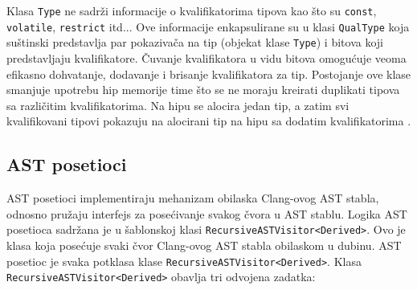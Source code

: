 \documentclass[12pt,oneside]{memoir}
\begin{document}
  \par
  Klasa \texttt{Type} ne sadr\v{z}i informacije o kvalifikatorima tipova kao \v{s}to su \texttt{const}, \texttt{volatile}, \texttt{restrict} itd... Ove informacije enkapsulirane su u klasi \texttt{QualType} koja su\v{s}tinski predstavlja par pokaziva\v{c}a na tip (objekat klase \texttt{Type}) i bitova koji predstavljaju
  kvalifikatore. \v{C}uvanje kvalifikatora u vidu bitova omogu\'{c}uje veoma efikasno dohvatanje, dodavanje i brisanje kvalifikatora za tip. Postojanje ove klase smanjuje upotrebu hip memorije time \v{s}to se ne moraju kreirati duplikati tipova sa razli\v{c}itim kvalifikatorima. Na hipu se alocira jedan tip, a zatim 
  svi kvalifikovani tipovi pokazuju na alocirani tip na hipu sa dodatim kvalifikatorima \cite{CFEWebsite}.

\subsection{AST posetioci}
AST posetioci implementiraju mehanizam obilaska Clang-ovog AST stabla, odnosno pru\v{z}aju interfejs
za pose\'{c}ivanje svakog \v{c}vora u AST stablu.
Logika AST posetioca sadr\v{z}ana je u šablonskoj klasi \texttt{RecursiveASTVisitor<Derived>}.
Ovo je klasa koja posećuje svaki čvor Clang-ovog AST stabla obilaskom u dubinu.
AST posetioc je svaka potklasa klase \texttt{RecursiveASTVisitor<Derived>}.
Klasa \texttt{RecursiveASTVisitor<Derived>} obavlja tri odvojena zadatka:
\end{document}
